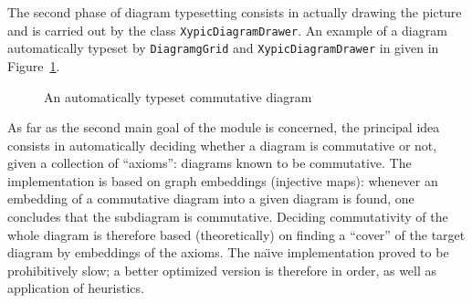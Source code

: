 The second phase of diagram typesetting consists in actually drawing the picture
and is carried out by the class \texttt{XypicDiagramDrawer}.  An example of a
diagram automatically typeset by \texttt{DiagramgGrid} and
\texttt{XypicDiagramDrawer} in given in Figure~\ref{fig:cat:loops}.
\begin{figure}[h]
  \centerline{
  }
  \caption{An automatically typeset commutative diagram}\label{fig:cat:loops}
\end{figure}

As far as the second main goal of the module is concerned, the principal idea
consists in automatically deciding whether a diagram is commutative or not,
given a collection of ``axioms'': diagrams known to be commutative. The
implementation is based on graph embeddings (injective maps): whenever an
embedding of a commutative diagram into a given diagram is found, one
concludes that the subdiagram is commutative. Deciding commutativity of the
whole diagram is therefore based (theoretically) on finding a ``cover'' of the
target diagram by embeddings of the axioms. The na\"{\i}ve implementation
proved to be prohibitively slow; a better optimized version is therefore in
order, as well as application of heuristics.
